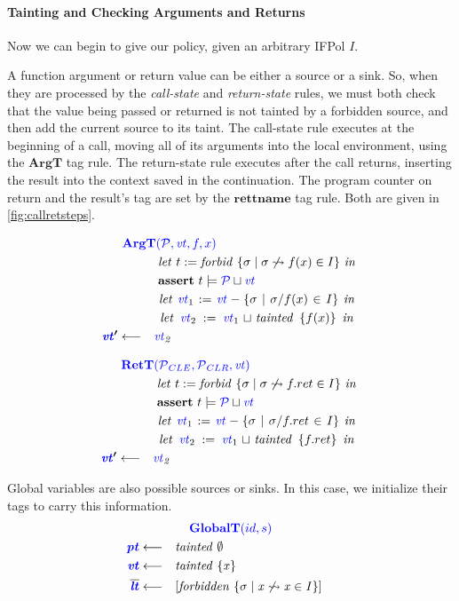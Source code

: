 \documentclass[acmsmall,review,anonymous]{acmart}\settopmatter{printfolios=true,printccs=false,printacmref=false}
\begin{document}
\paragraph{Tainting and Checking Arguments and Returns}

Now we can begin to give our policy, given an arbitrary IFPol \(I\).

A function argument or return value can be either a source or a sink.
So, when they are processed by the {\em call-state} and {\em return-state} rules,
we must both check that the value being passed or returned is not tainted by a forbidden
source, and then add the current source to its taint.
The call-state rule executes at the beginning of a call, moving all of its arguments into
the local environment, using the \(\mathbf{ArgT}\) tag rule.
The return-state rule executes after the call returns, inserting the result into the
context saved in the continuation. The program counter on return and the result's tag are
set by the \(\mathbf{rettname}\) tag rule. Both are given in \cref{fig:callretsteps}.

\begin{minipage}[t]{.49\textwidth}
  \[\begin{aligned}
  \truledef{\argt}
  \letin{t := \mathit{forbid} ~ \{\sigma \mid \sigma \not \rightsquigarrow f(x) \in I\}}
  \assert{t \models \PCT \sqcup \vt}
  \letin{\vt_1 := \vt - \{\sigma \mid \sigma / f(x) \in I \}}
  \letin{\vt_2 := \vt_1 \sqcup \mathit{tainted} ~ \{f(x)\}}
  \settag{\vt'}{\vt_2}
  \end{aligned}\]
\end{minipage}
\begin{minipage}[t]{.49\textwidth}            
  \[\begin{aligned}
  \truledef{\rett}
  \letin{t := \mathit{forbid} ~ \{\sigma \mid \sigma \not \rightsquigarrow f.ret \in I\}}
  \assert{t \models \PCT \sqcup \vt}
  \letin{\vt_1 := \vt - \{\sigma \mid \sigma / f.ret \in I \}}
  \letin{\vt_2 := \vt_1 \sqcup \mathit{tainted} ~ \{f.ret\}}
  \settag{\vt'}{\vt_2}
  \end{aligned}\]
\end{minipage}

Global variables are also possible sources or sinks. In this case, we initialize their
tags to carry this information.
\[\begin{aligned}
\truledef{\globalt}
\settag{\pt}{\mathit{tainted} ~ \emptyset}
\settag{\vt}{\mathit{tainted} ~ \{x\}}
\settag{\overline{\lt}}{\left[\mathit{forbidden} ~ \{\sigma \mid x \not \rightsquigarrow x \in I\}\right]}
\end{aligned}\]
\end{document}

